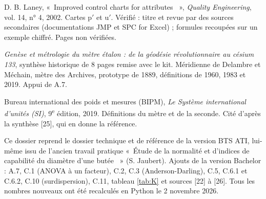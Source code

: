 \documentclass[11pt,a4paper]{article}
\providecommand{\og}{«~}\providecommand{\fg}{~»}
\begin{document}
\begin{enumerate}[label={[\arabic*]},leftmargin=2.2em,itemsep=2pt]
\item D. B. Laney, \og Improved control charts for attributes \fg, \emph{Quality Engineering}, vol. 14, n° 4, 2002. Cartes p$'$ et u$'$. Vérifié : titre et revue par des sources secondaires (documentations JMP et SPC for Excel) ; formules recoupées sur un exemple chiffré. Pages non vérifiées.
\item \emph{Genèse et métrologie du mètre étalon : de la géodésie révolutionnaire au césium 133}, synthèse historique de 8 pages remise avec le kit. Méridienne de Delambre et Méchain, mètre des Archives, prototype de 1889, définitions de 1960, 1983 et 2019. Appui de A.7.
\item Bureau international des poids et mesures (BIPM), \emph{Le Système international d'unités (SI)}, 9\textsuperscript{e} édition, 2019. Définitions du mètre et de la seconde. Cité d'après la synthèse [25], qui en donne la référence.
\end{enumerate}
\normalsize

\begin{note}
Ce dossier reprend le dossier technique et de référence de la version BTS ATI, lui-même issu de l'ancien travail pratique \og Étude de la normalité et d'indices de capabilité du diamètre d'une butée \fg{} (S. Jaubert). Ajouts de la version Bachelor : A.7, C.1 (ANOVA à un facteur), C.2, C.3 (Anderson-Darling), C.5, C.6.1 et C.6.2, C.10 (surdispersion), C.11, tableau \ref{tab:K} et sources [22] à [26]. Tous les nombres nouveaux ont été recalculés en Python le 2 novembre 2026.
\end{note}
\end{document}
